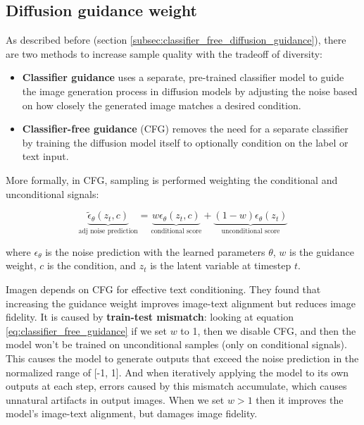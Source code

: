 \subsection{Diffusion guidance weight}
\label{subsec:imagen_diffusion_guidance_weight}

As described before (section \ref{subsec:classifier_free_diffusion_guidance}), there are two methods to increase sample quality with the tradeoff of diversity:

\begin{itemize}
    \item \textbf{Classifier guidance} uses a separate, pre-trained classifier model to guide the image generation process in diffusion models by adjusting the noise based on how closely the generated image matches a desired condition.
    
    \item \textbf{Classifier-free guidance} (CFG) removes the need for a separate classifier by training the diffusion model itself to optionally condition on the label or text input.
\end{itemize}

More formally, in CFG, sampling is performed weighting the conditional and unconditional signals:

\begin{equation}
    \underbrace{\tilde{\epsilon}_\theta (z_t, c)}_{\text{adj noise prediction}} = \underbrace{w \epsilon_\theta (z_t, c)}_{\text{conditional score}} + \underbrace{(1 - w) \epsilon_\theta (z_t)}_{\text{unconditional score}}
    \label{eq:classifier_free_guidance}
\end{equation}

where $\epsilon_\theta$ is the noise prediction with the learned parameters $\theta$, $w$ is the guidance weight, $c$ is the condition, and $z_t$ is the latent variable at timestep $t$.

Imagen depends on CFG for effective text conditioning. They found that increasing the guidance weight improves image-text alignment but reduces image fidelity. It is caused by \textbf{train-test mismatch}: looking at equation \ref{eq:classifier_free_guidance} if we set $w$ to 1, then we disable CFG, and then the model won't be trained on unconditional samples (only on conditional signals). This causes the model to generate outputs that exceed the noise prediction in the normalized range of [-1, 1]. And when iteratively applying the model to its own outputs at each step, errors caused by this mismatch accumulate, which causes unnatural artifacts in output images. When we set $w>1$ then it improves the model's image-text alignment, but damages image fidelity.

